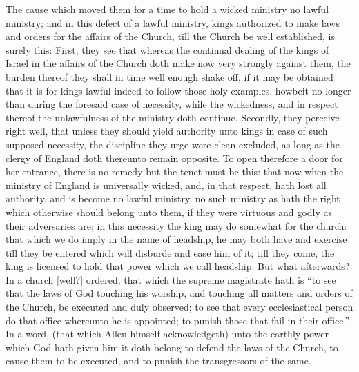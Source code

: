 The cause which moved them for a time to hold a wicked ministry no lawful ministry; and in this defect of a lawful ministry, kings authorized to make laws and orders for the affairs of the Church, till the Church be well established, is surely this: First, they see that whereas the continual dealing of the kings of Israel in the affairs of the Church doth make  now very strongly against them, the burden thereof they shall in time well enough shake off, if it may be obtained that it is for kings lawful indeed to follow those holy examples, howbeit no longer than during the foresaid case of necessity, while the wickedness, and in respect thereof the unlawfulness of the ministry doth continue. Secondly, they perceive right well, that unless they should yield authority unto kings in case of such supposed necessity, the discipline they urge were clean excluded, as long as the clergy of England doth thereunto remain opposite. To open therefore a door for her entrance, there is no remedy but the tenet must be this: that now when the ministry of England is universally wicked, and, in that respect, hath lost all authority, and is become no lawful ministry, no such ministry as hath the right which otherwise should belong unto them, if they were virtuous and godly as their adversaries are; in this necessity the king may do somewhat for the church: that which we do imply in the name of headship, he may both have and exercise till they be entered which will disburde and ease him of it; till they come, the king is licensed to hold that power which we call headship. But what afterwards? In a church [well?] ordered, that which the supreme magistrate hath is “to see that the laws of God touching his worship, and touching all matters and orders of the Church, be executed and duly observed; to see that every ecclesiastical person do that office whereunto he is appointed; to punish those that fail in their office.” In a word, (that which Allen himself acknowledgeth) unto the earthly power which God hath given him it doth belong to defend the laws of the Church, to cause them to be executed, and to punish the transgressors of the same.

